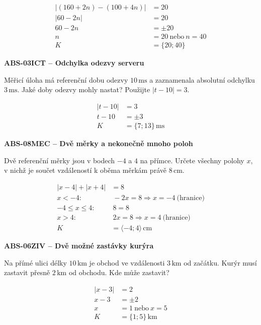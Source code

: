 \documentclass[11pt,a4paper]{article}
\begin{document}
\par\[\begin{aligned}
|(160+2n)-(100+4n)|&=20\\|60-2n|&=20\\60-2n&=\pm20\\n&=20\ \text{nebo}\ n=40\\K&=\{20;40\}
\end{aligned}\]
\par\medskip\noindent
\textbf{ABS-03}\quad\textbf{ICT -- Odchylka odezvy serveru}\par
Měřicí úloha má referenční dobu odezvy $10\,\mathrm{ms}$ a zaznamenala absolutní odchylku $3\,\mathrm{ms}$. Jaké doby odezvy mohly nastat? Použijte $|t-10|=3$.
\par\[\begin{aligned}
|t-10|&=3\\t-10&=\pm3\\K&=\{7;13\}\,\mathrm{ms}
\end{aligned}\]
\par\medskip\noindent
\textbf{ABS-08}\quad\textbf{MEC -- Dvě měrky a nekonečně mnoho poloh}\par
Dvě referenční měrky jsou v bodech $-4$ a $4$ na přímce. Určete všechny polohy $x$, v nichž je součet vzdáleností k oběma měrkám právě $8\,\mathrm{cm}$.
\par\[\begin{aligned}
|x-4|+|x+4|&=8\\x<-4:&\ -2x=8\Rightarrow x=-4\ \text{(hranice)}\\-4\le x\le4:&\ 8=8\\x>4:&\ 2x=8\Rightarrow x=4\ \text{(hranice)}\\K&=\langle-4;4\rangle\,\mathrm{cm}
\end{aligned}\]
\par\medskip\noindent
\textbf{ABS-06}\quad\textbf{ZIV -- Dvě možné zastávky kurýra}\par
Na přímé ulici délky $10\,\mathrm{km}$ je obchod ve vzdálenosti $3\,\mathrm{km}$ od začátku. Kurýr musí zastavit přesně $2\,\mathrm{km}$ od obchodu. Kde může zastavit?
\par\[\begin{aligned}
|x-3|&=2\\x-3&=\pm2\\x&=1\ \text{nebo}\ x=5\\K&=\{1;5\}\,\mathrm{km}
\end{aligned}\]
\end{document}
